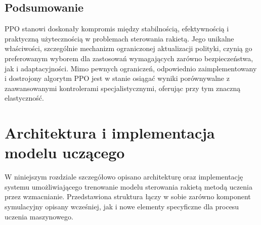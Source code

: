 %
%
%

\subsection{Podsumowanie}

PPO stanowi doskonały kompromis między stabilnością, efektywnością i praktyczną użytecznością w problemach sterowania rakietą. Jego unikalne właściwości, szczególnie mechanizm ograniczonej aktualizacji polityki, czynią go preferowanym wyborem dla zastosowań wymagających zarówno bezpieczeństwa, jak i adaptacyjności. Mimo pewnych ograniczeń, odpowiednio zaimplementowany i dostrojony algorytm PPO jest w stanie osiągać wyniki porównywalne z zaawansowanymi kontrolerami specjalistycznymi, oferując przy tym znaczną elastyczność.






\section{Architektura i implementacja modelu uczącego}
\label{sec:architektura-modelu}

W niniejszym rozdziale szczegółowo opisano architekturę oraz implementację systemu umożliwiającego trenowanie modelu sterowania rakietą metodą uczenia przez wzmacnianie. Przedstawiona struktura łączy w sobie zarówno komponent symulacyjny opisany wcześniej, jak i nowe elementy specyficzne dla procesu uczenia maszynowego.

